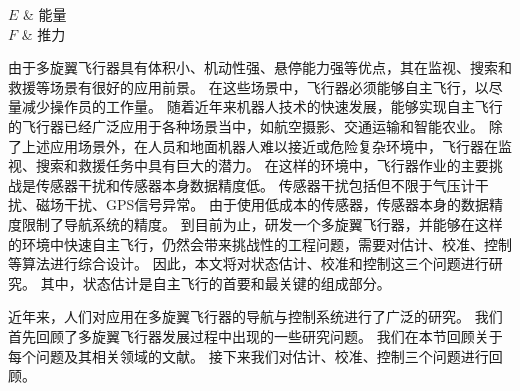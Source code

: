 \documentclass[
  type=master
]{gdutthesis}
\begin{document}
\begin{notation}
  $E$ & 能量 \\
  $F$ & 推力
\end{notation}

\gduttableofcontents

\mainmatter


由于多旋翼飞行器具有体积小、机动性强、悬停能力强等优点，其在监视、搜索和救援等场景有很好的应用前景。
在这些场景中，飞行器必须能够自主飞行，以尽量减少操作员的工作量。
随着近年来机器人技术的快速发展，能够实现自主飞行的飞行器已经广泛应用于各种场景当中，如航空摄影、交通运输和智能农业。
除了上述应用场景外，在人员和地面机器人难以接近或危险复杂环境中，飞行器在监视、搜索和救援任务中具有巨大的潜力。
在这样的环境中，飞行器作业的主要挑战是传感器干扰和传感器本身数据精度低。
传感器干扰包括但不限于气压计干扰、磁场干扰、GPS信号异常。
由于使用低成本的传感器，传感器本身的数据精度限制了导航系统的精度。
到目前为止，研发一个多旋翼飞行器，并能够在这样的环境中快速自主飞行，仍然会带来挑战性的工程问题，需要对估计、校准、控制等算法进行综合设计。
因此，本文将对状态估计、校准和控制这三个问题进行研究。
其中，状态估计是自主飞行的首要和最关键的组成部分。

近年来，人们对应用在多旋翼飞行器的导航与控制系统进行了广泛的研究。
我们首先回顾了多旋翼飞行器发展过程中出现的一些研究问题。
我们在本节回顾关于每个问题及其相关领域的文献。
接下来我们对估计、校准、控制三个问题进行回顾。
\end{document}
